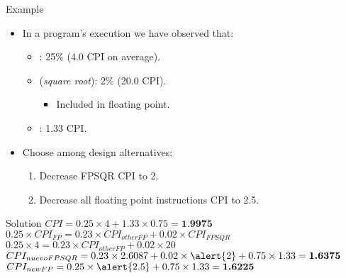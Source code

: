 \begin{frame}[t]{Example}
\begin{itemize}
  \item In a program's execution we have observed that:
    \begin{itemize}
      \item {}: 25\% (4.0 CPI on average).
      \item {} (\emph{square root}): 2\% (20.0 CPI).
        \begin{itemize}
          \item \alert{Included in floating point}.
        \end{itemize}
      \item {}: 1.33 CPI.
    \end{itemize}

  \item Choose among design alternatives:
    \begin{enumerate}[a]
      \item Decrease FPSQR CPI to 2.
      \item Decrease all floating point instructions CPI to 2.5.
    \end{enumerate}
\end{itemize}
\end{frame}

\begin{frame}[t]{Solution}
\begin{math}
CPI = 0.25 \times 4 + 1.33 \times 0.75 = \textbf{1.9975}
\end{math}
\begin{math}
0.25 \times CPI_{FP} = 0.23 \times CPI_{otherFP} + 0.02 \times CPI_{FPSQR}
\end{math}
\pause
\begin{math}
0.25 \times 4 = 0.23 \times CPI_{otherFP} + 0.02 \times 20
\end{math}
\pause
{}
\begin{math}
CPI_{nuevoFPSQR} = 0.23 \times 2.6087 + 0.02 \times \alert{2} + 0.75 \times 1.33 = \textbf{1.6375}
\end{math}
\pause
\begin{math}
CPI_{newFP} = 0.25 \times \alert{2.5} + 0.75 \times 1.33 = \textbf{1.6225}
\end{math}
\end{frame}

